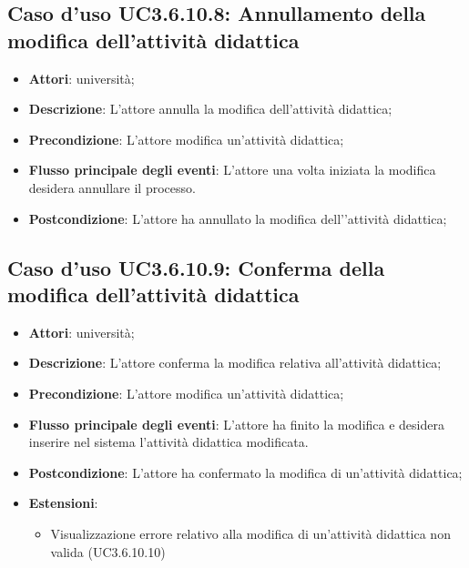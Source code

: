\subsection{Caso d'uso \texorpdfstring{UC3.6.10.8}{UC3.6.10.8}: Annullamento della modifica dell’attività didattica}
\begin{itemize}
\item \textbf{Attori}: università;
\item \textbf{Descrizione}: L'attore annulla la modifica dell’attività didattica;

\item \textbf{Precondizione}: L'attore modifica un’attività didattica;

\item \textbf{Flusso principale degli eventi}: L'attore una volta iniziata la modifica desidera annullare il processo.

\item \textbf{Postcondizione}: L'attore ha annullato la modifica dell'’attività didattica;

\end{itemize}
\subsection{Caso d'uso \texorpdfstring{UC3.6.10.9}{UC3.6.10.9}: Conferma della modifica dell’attività didattica}
\begin{itemize}
\item \textbf{Attori}: università;
\item \textbf{Descrizione}: L'attore conferma la modifica relativa all'attività didattica;

\item \textbf{Precondizione}: L'attore modifica un'attività didattica;

\item \textbf{Flusso principale degli eventi}: L'attore ha finito la modifica e desidera inserire nel sistema l'attività didattica modificata.

\item \textbf{Postcondizione}: L'attore ha confermato la modifica di un'attività didattica;

\item \textbf{Estensioni}:
\begin{itemize}
\item Visualizzazione errore relativo alla modifica di un’attività didattica non valida (UC3.6.10.10)
\end{itemize}
\end{itemize}

